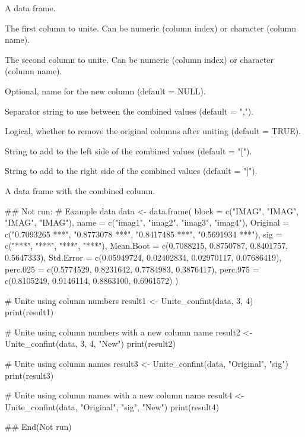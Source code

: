\documentclass[a4paper]{book}
\begin{document}
\begin{Arguments}
\begin{ldescription}
\item[\code{data}] A data frame.

\item[\code{col1}] The first column to unite. Can be numeric (column index) or character (column name).

\item[\code{col2}] The second column to unite. Can be numeric (column index) or character (column name).

\item[\code{Col}] Optional, name for the new column (default = NULL).

\item[\code{sep}] Separator string to use between the combined values (default = ",").

\item[\code{remove}] Logical, whether to remove the original columns after uniting (default = TRUE).

\item[\code{left}] String to add to the left side of the combined values (default = "[").

\item[\code{right}] String to add to the right side of the combined values (default = "]").
\end{ldescription}
\end{Arguments}
%
\begin{Value}
A data frame with the combined column.
\end{Value}
%
\begin{Examples}
\begin{ExampleCode}
## Not run: 
# Example data
data <- data.frame(
  block = c("IMAG", "IMAG", "IMAG", "IMAG"),
  name = c("imag1", "imag2", "imag3", "imag4"),
  Original = c("0.7093265 ***", "0.8773078 ***", "0.8417485 ***", "0.5691934 ***"),
  sig = c("***", "***", "***", "***"),
  Mean.Boot = c(0.7088215, 0.8750787, 0.8401757, 0.5647333),
  Std.Error = c(0.05949724, 0.02402834, 0.02970117, 0.07686419),
  perc.025 = c(0.5774529, 0.8231642, 0.7784983, 0.3876417),
  perc.975 = c(0.8105249, 0.9146114, 0.8863100, 0.6961572)
)

# Unite using column numbers
result1 <- Unite_confint(data, 3, 4)
print(result1)

# Unite using column numbers with a new column name
result2 <- Unite_confint(data, 3, 4, "New")
print(result2)

# Unite using column names
result3 <- Unite_confint(data, "Original", "sig")
print(result3)

# Unite using column names with a new column name
result4 <- Unite_confint(data, "Original", "sig", "New")
print(result4)

## End(Not run)
\end{ExampleCode}
\end{Examples}
\end{document}
